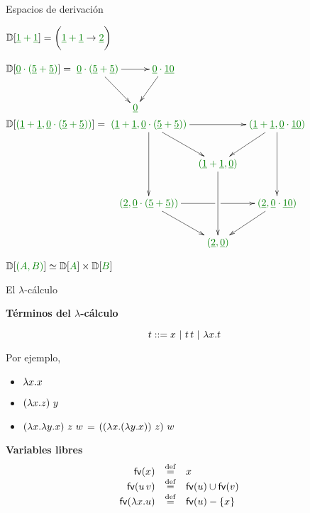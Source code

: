 \documentclass{beamer}
\newcommand{\cArith}[1]{{\color{darkGreen} #1}}
\newcommand{\uline}[1]{\underline{#1}}
\begin{document}
\begin{frame}{Espacios de derivación}

$
\ulbDeriv{\cArith{\uline{1} + \uline{1}}} =
  \bigg(\cArith{\uline{1} + \uline{1}} \to \cArith{\uline{2}}\bigg)
$

$\ulbDeriv{\cArith{\uline{0} \cdot (\uline{5} + \uline{5})}} =
\xymatrix@C=0.3cm{
  \cArith{\uline{0} \cdot (\uline{5} + \uline{5})} \ar[rr] \ar[dr] &  & \cArith{\uline{0} \cdot \uline{10}} \ar[dl] \\
  & \cArith{\uline{0}}   &
}
$
{\footnotesize
$\ulbDeriv{\cArith{(\uline{1} + \uline{1}, \uline{0} \cdot (\uline{5} + \uline{5}))}} =
\xymatrix@C=0.2cm{
  \cArith{(\uline{1} + \uline{1}, \uline{0} \cdot (\uline{5} + \uline{5}))} \ar[rr] \ar[dr] \ar[dd]&  & \cArith{(\uline{1} + \uline{1}, \uline{0} \cdot \uline{10})} \ar[dd] \ar[dl] \\
  & \cArith{(\uline{1} + \uline{1}, \uline{0})}  \ar[dd] & \\
  \cArith{(\uline{2}, \uline{0} \cdot (\uline{5} + \uline{5}))} \ar[rr]|!{[r]}\hole \ar[dr] &  & \cArith{(\uline{2}, \uline{0} \cdot \uline{10})} \ar[dl] \\
  & \cArith{(\uline{2}, \uline{0})}   & \\
}$
}

$\ulbDeriv{\cArith{(A,B)}} \simeq \ulbDeriv{\cArith{A}} \times \ulbDeriv{\cArith{B}}$

\end{frame}

\begin{frame}{El $\lambda$-cálculo}

\textbf{Términos del $\lambda$-cálculo}

\[
  t ::= x\  |\ t\, t \ |\ \lam{x}{t}
\]

Por ejemplo,
\begin{itemize}
 \item[] $\lambda x. x$
 \item[] $(\lambda x. z)\ y$
 \item[] $(\lambda x. \lambda y. x)\ z\ w$ = $((\lam{x}{(\lam{y}{x})})\ z)\ w$
\end{itemize}

\vskip 0.5cm

\textbf{Variables libres}
\[
\begin{array}{rclc}
  \mathsf{fv}({x}) & \overset{\mathrm{def}}{=} & x & \\
  \mathsf{fv}({u\, v}) & \overset{\mathrm{def}}{=} & \mathsf{fv}({u}) \cup \mathsf{fv}({v}) & \\
  \mathsf{fv}({\lambda x. u}) & \overset{\mathrm{def}}{=} & \mathsf{fv}({u}) - \{x\} & \\
\end{array}
\]
\end{frame}
\end{document}
